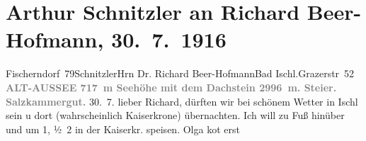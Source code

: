 

         
         \renewcommand{\erwaehntePersonen}{Personen: Richard Beer-Hofmann, Paula Beer-Hofmann, Olga Schnitzler}
         \renewcommand{\erwaehnteOrte}{Orte: Altaussee, Aschau, Bad Ischl, Dachstein, Fischerndorf, Grazer Straße, Hotel Kaiserkrone, Restaurant Sonnenschein, Salzkammergut}
         \renewcommand{\erwaehnteWerke}{}
               \section[Arthur Schnitzler an Richard Beer-Hofmann, 30. 7. 1916]{ Arthur Schnitzler an Richard Beer-Hofmann, 30. 7. 1916}\nopagebreak{}\rehead{ }\begin{ledgroupsized}[t]{13cm}\normalsize\beginnumbering \toendnotes[C]{\smallbreak\pagebreak[2]} 
\toendnotes[C]{\smallbreak}\pstart{}{\pb}Fischerndorf 79\pend{}\pstart{}Schnitzler\pend{}{\bigskip}\pstart{}Hrn Dr. Richard Beer-Hofmann\pend{}\pstart{}Bad Ischl.\pend{}\pstart{}Grazerstr 52\pend{}{\bigskip}\pstart
           \noindent{}\centering{}{\pb}\textcolor{gray}{\textbf{ALT-AUSSEE 717 m Seehöhe mit dem Dachstein
                     2996 m. Steier. Salzkammergut.}}\pend
           \pstart
           \raggedleft{}{\pb}30. 7.\pend
           \pstart
           lieber Richard,{ }\label{K_L02235-1v}\label{K_L02235-1h} dürften wir bei schönem Wetter in Ischl
               sein u dort (wahrscheinlich Kaiserkrone)
               übernachten. Ich will zu Fuß hinüber und um 1, ½ 2 in der
                  Kaiserkr. speisen. Olga ko{\geminationm}t erst

\end{ledgroupsized}
